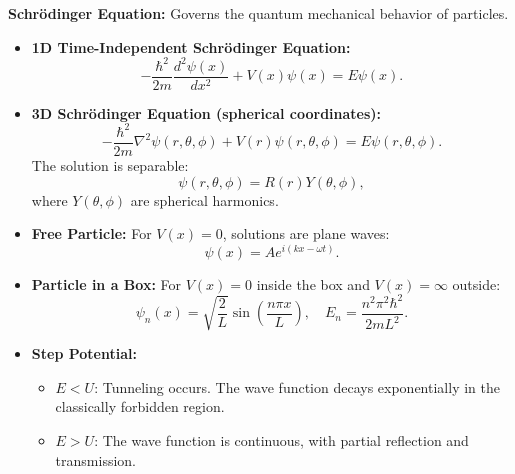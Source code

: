 \documentclass{article}
\newcommand{\conceptbox}[1]{\begin{tcolorbox}[colback=blue!10] #1 \end{tcolorbox}}
\begin{document}
\conceptbox{
\textbf{Schrödinger Equation:} Governs the quantum mechanical behavior of particles.
\begin{itemize}
    \item \textbf{1D Time-Independent Schrödinger Equation:}
    \[
    -\frac{\hbar^2}{2m} \frac{d^2\psi(x)}{dx^2} + V(x)\psi(x) = E\psi(x).
    \]

    \item \textbf{3D Schrödinger Equation (spherical coordinates):}
    \[
    -\frac{\hbar^2}{2m} \nabla^2 \psi(r, \theta, \phi) + V(r)\psi(r, \theta, \phi) = E\psi(r, \theta, \phi).
    \]
    The solution is separable:
    \[
    \psi(r, \theta, \phi) = R(r)Y(\theta, \phi),
    \]
    where \( Y(\theta, \phi) \) are spherical harmonics.

    \item \textbf{Free Particle:}
    For \( V(x) = 0 \), solutions are plane waves:
    \[
    \psi(x) = Ae^{i(kx - \omega t)}.
    \]

    \item \textbf{Particle in a Box:}
    For \( V(x) = 0 \) inside the box and \( V(x) = \infty \) outside:
    \[
    \psi_n(x) = \sqrt{\frac{2}{L}} \sin\left(\frac{n\pi x}{L}\right), \quad E_n = \frac{n^2\pi^2\hbar^2}{2mL^2}.
    \]

    \item \textbf{Step Potential:}
    \begin{itemize}
        \item \( E < U \): Tunneling occurs. The wave function decays exponentially in the classically forbidden region.
        \item \( E > U \): The wave function is continuous, with partial reflection and transmission.
    \end{itemize}
\end{itemize}
}
\end{document}
